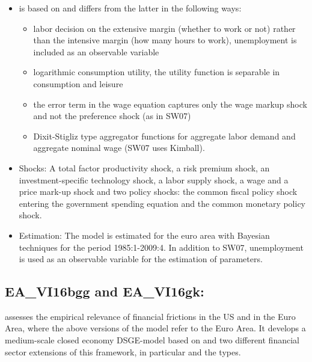 \documentclass[11pt,a4paper]{article}
\begin{document}
	\begin{itemize}
		
		\item \cite{gali2012unemployment} is based on \cite{SmetsWouters2007} and differs from the latter in the following ways: 
		\begin{itemize}
			
			\item labor decision on the extensive margin (whether to work or not) rather than the intensive margin (how many hours to work), unemployment is included as an observable variable
			\item logarithmic consumption utility, the utility function is separable in consumption and leisure
			\item the error term in the wage equation captures only the wage markup shock and not the preference shock (as in SW07)
			\item Dixit-Stigliz type aggregator functions for aggregate labor demand and aggregate nominal wage (SW07 uses Kimball).
		\end{itemize}
		
		\item Shocks: A total factor productivity shock, a risk premium shock, an investment-specific technology shock, a labor
		supply shock, a wage and a price mark-up shock and two policy shocks: the common fiscal policy shock entering the government
		spending equation and the common monetary policy shock.
		
		\item Estimation: The model is estimated for the euro area with Bayesian techniques for the period 1985:1-2009:4. In addition to SW07, unemployment is used as an observable variable for the estimation of parameters.
		
	\end{itemize}
	
	
	
	
	
	
	
	
	
	\subsection{EA\_VI16bgg and EA\_VI16gk: \texorpdfstring{\cite{villa2016}}{Villa (2016)}}
	\label{EAVI16}
	\cite{villa2016} assesses the empirical relevance of financial frictions in the US and in the Euro Area, where the above versions of the model refer to the Euro Area. It develops a medium-scale closed economy DSGE-model based on \cite{SmetsWouters2007} and two different financial sector extensions of this framework, in particular \cite{bernanke1996financial} and the \cite{GertlerKaradi2011} types.
	
\end{document}
